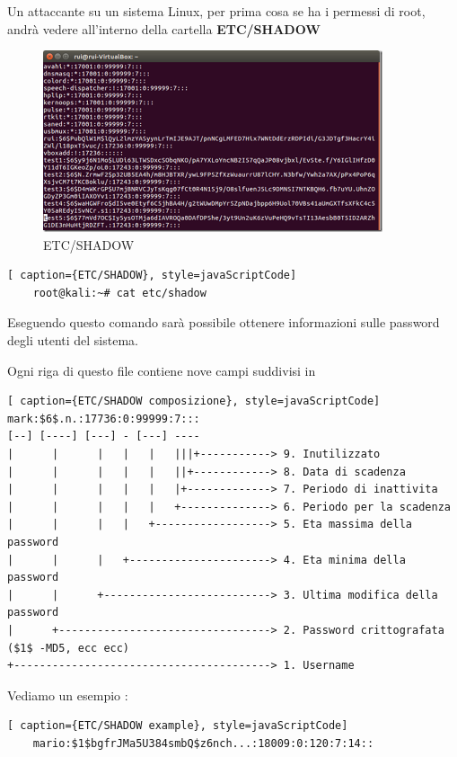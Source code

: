 Un attaccante su un sistema Linux\cite{hash_Linux}, per prima cosa se ha i permessi di root, andrà vedere all'interno della cartella \textbf{ETC/SHADOW}

\begin{figure}[h!]
    \centering
    \includegraphics[width=100mm]{Immagini/2/linux_1.png}
    \caption{ETC/SHADOW}
    \label{fig:ProcDump}
\end{figure}

\begin{lstlisting}[ caption={ETC/SHADOW}, style=javaScriptCode]
    root@kali:~# cat etc/shadow
\end{lstlisting}

Eseguendo questo comando sarà possibile ottenere informazioni sulle password degli utenti del sistema.

Ogni riga di questo file contiene nove campi suddivisi in 

\begin{lstlisting}[ caption={ETC/SHADOW composizione}, style=javaScriptCode]
mark:$6$.n.:17736:0:99999:7:::
[--] [----] [---] - [---] ----
|      |      |   |   |   |||+-----------> 9. Inutilizzato
|      |      |   |   |   ||+------------> 8. Data di scadenza
|      |      |   |   |   |+-------------> 7. Periodo di inattivita
|      |      |   |   |   +--------------> 6. Periodo per la scadenza
|      |      |   |   +------------------> 5. Eta massima della password
|      |      |   +----------------------> 4. Eta minima della password
|      |      +--------------------------> 3. Ultima modifica della password
|      +---------------------------------> 2. Password crittografata ($1$ -MD5, ecc ecc)
+----------------------------------------> 1. Username
\end{lstlisting}

Vediamo un esempio :

\begin{lstlisting}[ caption={ETC/SHADOW example}, style=javaScriptCode]
    mario:$1$bgfrJMa5U384smbQ$z6nch...:18009:0:120:7:14::
\end{lstlisting}

